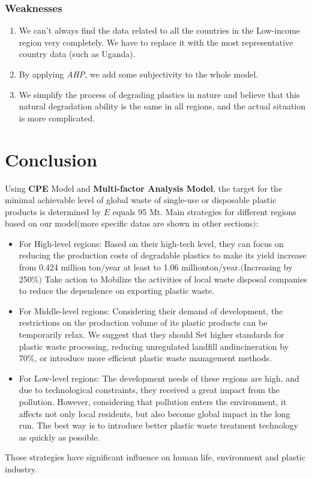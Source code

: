 \documentclass{mcmthesis}
\begin{document}
\subsubsection{Weaknesses}
   \begin{enumerate}
    \item We can't always find the data related to all the countries in the Low-income region very completely. We have to replace it with the most representative country data (such as Uganda).\\
    \item By applying \textit{AHP}, we add some subjectivity to the whole model.
    \item We simplify the process of degrading plastics in nature and believe that this natural degradation ability is the same in all regions, and the actual situation is more complicated.\\
   \end{enumerate}


\section{Conclusion}
  Using \textbf{CPE} Model and \textbf{Multi-factor Analysis Model}, the target for the minimal achievable level of global 
  waste of single-use or disposable plastic products is determined by $E$ equals 95 Mt.
  Main strategies for different regions based on our model$($more specific datas are shown in other sections$)$:
  \begin{itemize}
	\item \quad For High-level regions: Based on their high-tech level, they can focus on reducing the production costs of degradable plastics to make its yield increase from 0.424 million ton/year at least to 1.06 millionton/year.$($Increasing by 250\%$)$ Take action to Mobilize the activities of local waste disposal companies to reduce the dependence on exporting plastic waste.
	\item \quad For Middle-level regions: Considering their demand of development, the restrictions on the production volume of its plastic products can be temporarily relax. We suggest that they should Set higher standards for plastic waste processing, reducing unregulated landfill andincineration by 70\%, or introduce more efficient plastic waste management methods.
	
	\item \quad For Low-level regions: The development needs of these regions are high, and due to technological constraints, they received a great impact from the pollution. However, considering that pollution enters the environment, it affects not only local residents, but also become global impact in the long run. The best way is to introduce better plastic waste treatment technology as quickly as possible.
   
	\end{itemize}
	Those strategies have significant influence on human life, environment and plastic industry.
\end{document}
